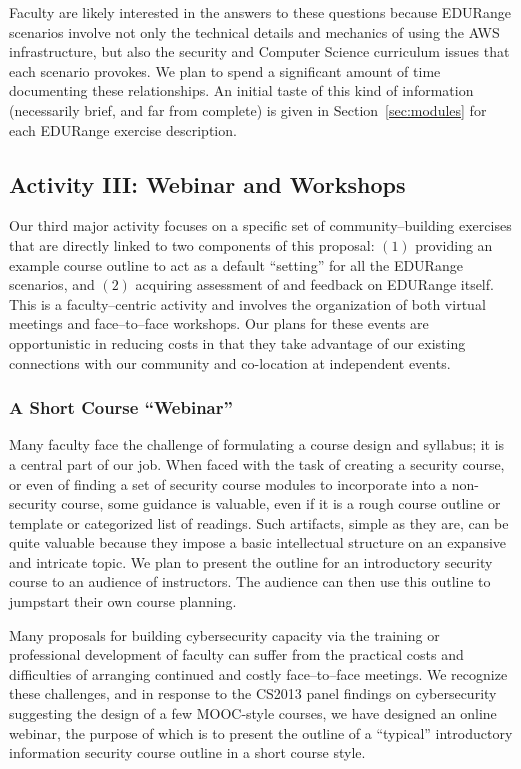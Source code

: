 Faculty are likely interested in the answers to these questions
because EDURange scenarios involve not only the technical details and
mechanics of using the AWS infrastructure, but also the security and
Computer Science curriculum issues that each scenario provokes.  We
plan to spend a significant amount of time documenting these
relationships.  An initial taste of this kind of information
(necessarily brief, and far from complete) is given in
Section~\ref{sec:modules} for each EDURange exercise description.

\subsection{Activity III: Webinar and Workshops}

Our third major activity focuses on a specific set of
community--building exercises that are directly linked to two
components of this proposal: $(1)$ providing an example course outline
to act as a default ``setting'' for all the EDURange scenarios, and
$(2)$ acquiring assessment of and feedback on EDURange itself.  This
is a faculty--centric activity and involves the organization of both
virtual meetings and face--to--face workshops.  Our plans for these
events are opportunistic in reducing costs in that they take advantage
of our existing connections with our community and co-location at
independent events.

\subsubsection{A Short Course ``Webinar''}

Many faculty face the challenge of formulating a course design and
syllabus; it is a central part of our job.  When faced with the task
of creating a security course, or even of finding a set of security
course modules to incorporate into a non-security course, some
guidance is valuable, even if it is a rough course outline or template
or categorized list of readings. Such artifacts, simple as they are,
can be quite valuable because they impose a basic intellectual
structure on an expansive and intricate topic.  We plan to present the
outline for an introductory security course to an audience of
instructors. The audience can then use this outline to jumpstart their
own course planning.

Many proposals for building cybersecurity capacity via the training or
professional development of faculty can suffer from the practical
costs and difficulties of arranging continued and costly
face--to--face meetings.  We recognize these challenges, and in
response to the CS2013 panel findings on cybersecurity suggesting the
design of a few MOOC-style courses, we have designed an online
webinar, the purpose of which is to present the outline of a
``typical'' introductory information security course outline in a
short course style.

